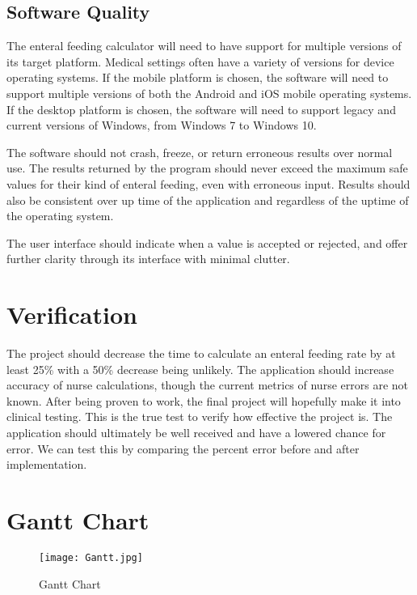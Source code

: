 \documentclass[fullpage,10pt, onecolumn, draftclsnofoot]{IEEEtran}
\begin{document}
\subsection{Software Quality}
The enteral feeding calculator will need to have support for multiple versions of its target platform. Medical settings often
have a variety of versions for device operating systems. If the mobile platform is chosen, the software will need to support 
multiple versions of both the Android and iOS mobile operating systems. If the desktop platform is chosen, the software will need
to support legacy and current versions of Windows, from Windows 7 to Windows 10.

The software should not crash, freeze, or return erroneous results over normal use. The results returned by the program should never
exceed the maximum safe values for their kind of enteral feeding, even with erroneous input. Results should also be consistent over
up time of the application and regardless of the uptime of the operating system.

The user interface should indicate when a value is accepted or rejected, and offer further clarity through its interface with minimal clutter.

\section{Verification}
The project should decrease the time to calculate an enteral feeding rate by at least 25\% with a  50\% decrease being unlikely.
The application should increase accuracy of nurse calculations, though the current metrics of nurse errors are not known.
After being proven to work, the final project will hopefully make it into clinical testing. This is the true test to verify how effective the project is. The application should ultimately be well received and have a lowered chance for error. We can test this by comparing the percent error before and after implementation.
\section{Gantt Chart}
\begin{figure}[h!]
\centering
\texttt{[image: Gantt.jpg]}
\centering
\caption{Gantt Chart}
\label{fig:gantt_chartl}
\end{figure}
\end{document}
